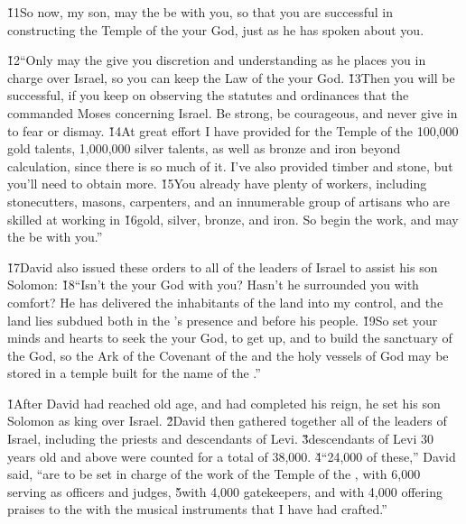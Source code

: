 \v{11}So now, my son, may the  be with you, so that you are successful in constructing the Temple of the  your God, just as he has spoken about you.

\v{12}``Only may the  give you discretion and understanding as he places you in charge over Israel, so you can keep the Law of the  your God. \v{13}Then you will be successful, if you keep on observing the statutes and ordinances that the  commanded Moses concerning Israel. Be strong, be courageous, and never give in to fear or dismay. \v{14}At great effort I have provided for the Temple of the  100,000 gold talents, 1,000,000 silver talents, as well as bronze and iron beyond calculation, since there is so much of it. I've also provided timber and stone, but you'll need to obtain more. \v{15}You already have plenty of workers, including stonecutters, masons, carpenters, and an innumerable group of artisans who are skilled at working in \v{16}gold, silver, bronze, and iron. So begin the work, and may the  be with you.''

\v{17}David also issued these orders to all of the leaders of Israel to assist his son Solomon: \v{18}``Isn't the  your God with you? Hasn't he surrounded you with comfort? He has delivered the inhabitants of the land into my control, and the land lies subdued both in the 's presence and before his people. \v{19}So set your minds and hearts to seek the  your God, to get up, and to build the sanctuary of the  God, so the Ark of the Covenant of the  and the holy vessels of God may be stored in a temple built for the name of the .''

\v{1}After David had reached old age, and had completed his reign, he set his son Solomon as king over Israel. \v{2}David then gathered together all of the leaders of Israel, including the priests and descendants of Levi. \v{3}descendants of Levi 30 years old and above were counted for a total of 38,000. \v{4}``24,000 of these,'' David said, ``are to be set in charge of the work of the Temple of the , with 6,000 serving as officers and judges, \v{5}with 4,000 gatekeepers, and with 4,000 offering praises to the  with the musical instruments that I have had crafted.''

